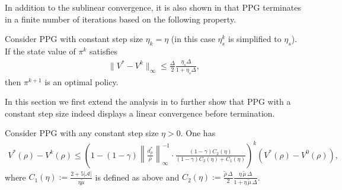 In addition to the sublinear convergence, it is also shown in \cite{ppgliu} that PPG terminates in a finite number of iterations based on the following property. 
\begin{lemma}\label{lem:ppg-finite}
Consider PPG with constant step size $\eta_k=\eta$ \textup{(}in this case $\eta_s^k$ is simplified to $\eta_s$\textup{)}.
If the state value of $\pi^k$ satisfies 
    \begin{align*}
\|V^*-V^k\|_\infty \leq \frac{\Delta}{2}\frac{\eta_s\Delta}{1+\eta_s\Delta},
\end{align*}
then $\pi^{k+1}$ is an optimal policy.
\end{lemma}
In this section we  first extend the analysis in \cite{ppgliu} to further show that PPG with a constant step size indeed displays a linear convergence before termination.
\begin{theorem}\label{thm:PPG-linear}
    Consider PPG with any constant step size $\eta>0$. One has 
    \begin{align*}
    V^*(\rho )-V^k(\rho )\le \left( 1-(1-\gamma )\left\| \frac{d_{\rho}^{*}}{\rho} \right\| _{\infty}^{-1}\cdot \frac{(1-\gamma )C_2\left( \eta \right)}{(1-\gamma )C_2\left( \eta \right) +C_1(\eta )} \right) ^k\left( V^*(\rho )-V^0(\rho ) \right),
    \end{align*}
where $
C_1\left( \eta \right) :=\frac{2+5\left| \mathcal{A} \right|}{\eta \tilde{\mu}}$ is defined as above and $
C_2\left( \eta \right) :=\frac{\tilde{\rho}\,\Delta }{2}\frac{\eta \,\tilde{\mu}\,\Delta}{1+\eta \,\tilde{\mu}\,\Delta}$. 
\end{theorem}

